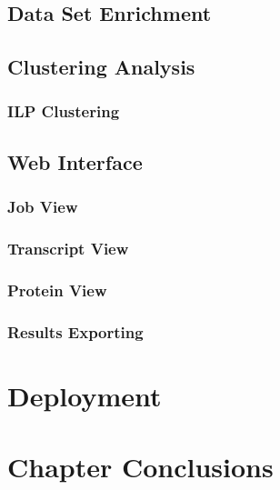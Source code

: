 \subsection{Data Set Enrichment}

\subsection{Clustering Analysis}

\subsubsection*{ILP Clustering}

\subsection{Web Interface}

\subsubsection*{Job View}

\subsubsection*{Transcript View}

\subsubsection*{Protein View}

\subsubsection*{Results Exporting}

\section{Deployment}

\section{Chapter Conclusions}

